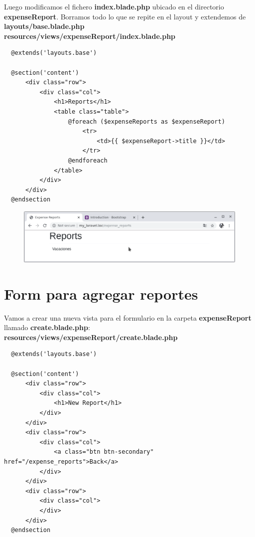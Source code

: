 \documentclass{article}
\begin{document}
Luego modificamos el fichero \textbf{index.blade.php} ubicado en el directorio
\textbf{expenseReport}. Borramos todo lo que se repite en el layout y
extendemos de \textbf{layouts/base.blade.php}\\

\textbf{resources/views/expenseReport/index.blade.php}
\begin{verbatim}
  @extends('layouts.base')

  @section('content')
      <div class="row">
          <div class="col">
              <h1>Reports</h1>
              <table class="table">
                  @foreach ($expenseReports as $expenseReport)
                      <tr>
                          <td>{{ $expenseReport->title }}</td>
                      </tr>
                  @endforeach
              </table>
          </div>
      </div>
  @endsection
\end{verbatim}

\begin{figure}[h!]
  \centering
  \includegraphics[scale=0.5]{./Pictures/054_extends_layout.png}
\end{figure}



\section{Form para agregar reportes}%

Vamos a crear una nueva vista para el formulario en la carpeta
\textbf{expenseReport} llamado \textbf{create.blade.php}:\\

\textbf{resources/views/expenseReport/create.blade.php}
\begin{verbatim}
  @extends('layouts.base')

  @section('content')
      <div class="row">
          <div class="col">
              <h1>New Report</h1>
          </div>
      </div>
      <div class="row">
          <div class="col">
              <a class="btn btn-secondary" href="/expense_reports">Back</a>
          </div>
      </div>
      <div class="row">
          <div class="col">
          </div>
      </div>
  @endsection
\end{verbatim}
\end{document}
